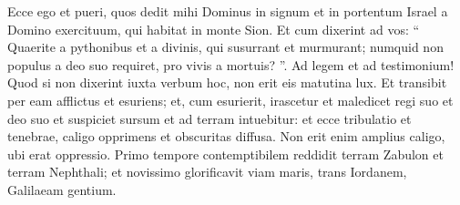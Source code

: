 \begin{biblechapter}
\begin{biblechapter}
\begin{biblechapter}
\begin{biblechapter}
\begin{biblechapter}
\begin{biblechapter}
\begin{biblechapter}
\begin{biblechapter}
\verse Ecce ego et pueri, quos dedit mihi Dominus in signum et in portentum Israel a Domino exercituum, qui habitat in monte Sion. 
\verse Et cum dixerint ad vos: “ Quaerite a pythonibus et a divinis, qui susurrant et murmurant; numquid non populus a deo suo requiret, pro vivis a mortuis? ”. 
\verse Ad legem et ad testimonium! Quod si non dixerint iuxta verbum hoc, non erit eis matutina lux.
 \verse Et transibit per eam afflictus et esuriens;
 et, cum esurierit, irascetur
 et maledicet regi suo et deo suo
 et suspiciet sursum
 \verse et ad terram intuebitur:
 et ecce tribulatio et tenebrae,
 caligo opprimens et obscuritas diffusa.
 \verse Non erit enim amplius caligo,
 ubi erat oppressio.
 Primo tempore contemptibilem reddidit terram Zabulon et terram Nephthali; et novissimo glorificavit viam maris, trans Iordanem, Galilaeam gentium.
 

\end{biblechapter}
\end{biblechapter}
\end{biblechapter}
\end{biblechapter}
\end{biblechapter}
\end{biblechapter}
\end{biblechapter}
\end{biblechapter}
